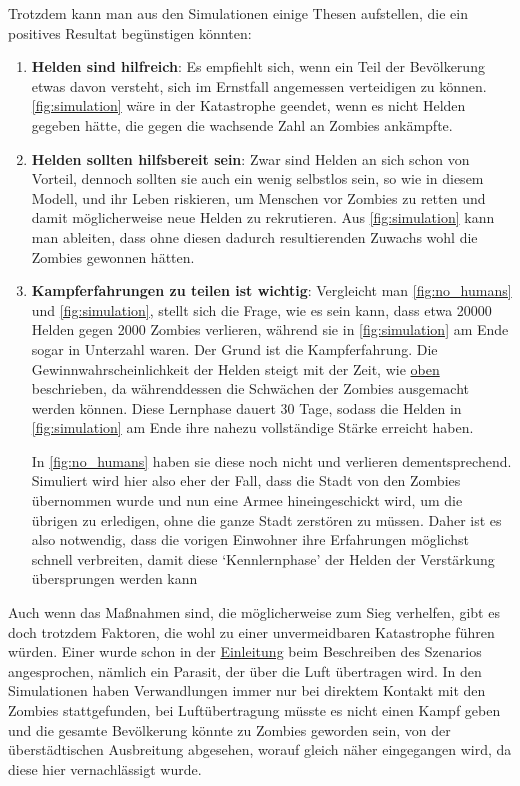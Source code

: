     Trotzdem kann man aus den Simulationen einige Thesen aufstellen, die ein positives Resultat begünstigen könnten:
    \begin{enumerate}[1.]
        \item \textbf{Helden sind hilfreich}:
            Es empfiehlt sich, wenn ein Teil der Bevölkerung etwas davon versteht, sich im Ernstfall angemessen verteidigen zu können. \autoref{fig:simulation} wäre in der Katastrophe geendet, wenn es nicht Helden gegeben hätte, die gegen die wachsende Zahl an Zombies ankämpfte.

        \item \textbf{Helden sollten hilfsbereit sein}:
            Zwar sind Helden an sich schon von Vorteil, dennoch sollten sie auch ein wenig selbstlos sein, so wie in diesem Modell, und ihr Leben riskieren, um Menschen vor Zombies zu retten und damit möglicherweise neue Helden zu rekrutieren. Aus \autoref{fig:simulation} kann man ableiten, dass ohne diesen dadurch resultierenden Zuwachs wohl die Zombies gewonnen hätten.

        \item \textbf{Kampferfahrungen zu teilen ist wichtig}:
            Vergleicht man \autoref{fig:no_humans} und \autoref{fig:simulation}, stellt sich die Frage, wie es sein kann, dass etwa 20000 Helden gegen 2000 Zombies verlieren, während sie in \autoref{fig:simulation} am Ende sogar in Unterzahl waren. Der Grund ist die Kampferfahrung. Die Gewinnwahrscheinlichkeit der Helden steigt mit der Zeit, wie \hyperref[steps:no_humans]{oben} beschrieben, da währenddessen die Schwächen der Zombies ausgemacht werden können. Diese Lernphase dauert 30 Tage, sodass die Helden in \autoref{fig:simulation} am Ende ihre nahezu vollständige Stärke erreicht haben.

            In \autoref{fig:no_humans} haben sie diese noch nicht und verlieren dementsprechend. Simuliert wird hier also eher der Fall, dass die Stadt von den Zombies übernommen wurde und nun eine Armee hineingeschickt wird, um die übrigen zu erledigen, ohne die ganze Stadt zerstören zu müssen. Daher ist es also notwendig, dass die vorigen Einwohner ihre Erfahrungen möglichst schnell verbreiten, damit diese `Kennlernphase' der Helden der Verstärkung übersprungen werden kann
    \end{enumerate}
    Auch wenn das Maßnahmen sind, die möglicherweise zum Sieg verhelfen, gibt es doch trotzdem Faktoren, die wohl zu einer unvermeidbaren Katastrophe führen würden. Einer wurde schon in der \hyperref[sec:einleitung]{Einleitung} beim Beschreiben des Szenarios angesprochen, nämlich ein Parasit, der über die Luft übertragen wird. In den Simulationen haben Verwandlungen immer nur bei direktem Kontakt mit den Zombies stattgefunden, bei Luftübertragung müsste es nicht einen Kampf geben und die gesamte Bevölkerung könnte zu Zombies geworden sein, von der überstädtischen Ausbreitung abgesehen, worauf gleich näher eingegangen wird, da diese hier vernachlässigt wurde.

